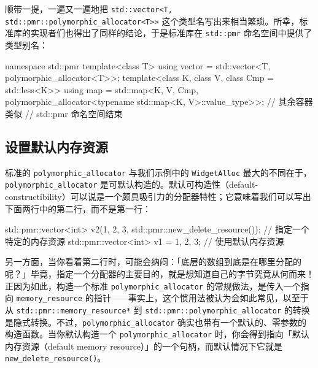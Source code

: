 顺带一提，一遍又一遍地把 \texttt{std::\allowbreak{}vector<\allowbreak{}T,\allowbreak{} std::\allowbreak{}pmr::\allowbreak{}polymorphic\_\allowbreak{}allocator<\allowbreak{}T>\allowbreak{}>} 这个类型名写出来相当繁琐。所幸，标准库的实现者们也得出了同样的结论，于是标准库在 \texttt{std::\allowbreak{}pmr} 命名空间中提供了类型别名：

\begin{codebox}[cpp]
    namespace std::pmr {
      template<class T>
      using vector = std::vector<T,
        polymorphic_allocator<T>>;
      template<class K, class V, class Cmp = std::less<K>>
      using map = std::map<K, V, Cmp,
        polymorphic_allocator<typename std::map<K, V>::value_type>>;
      // 其余容器类似
    } // std::pmr 命名空间结束
\end{codebox}

\subsection{设置默认内存资源}

标准的 \texttt{polymorphic\_\allowbreak{}allocator} 与我们示例中的 \texttt{Widget\allowbreak{}Alloc} 最大的不同在于，\texttt{polymorphic\_\allowbreak{}allocator} 是可默认构造的。默认可构造性（default-constructibility）可以说是一个颇具吸引力的分配器特性；它意味着我们可以写出下面两行中的第二行，而不是第一行：

\begin{codebox}[cpp]
    std::pmr::vector<int> v2({1, 2, 3}, std::pmr::new_delete_resource());
        // 指定一个特定的内存资源
    std::pmr::vector<int> v1 = {1, 2, 3};
        // 使用默认内存资源
\end{codebox}

另一方面，当你看着第二行时，可能会纳闷：「底层的数组到底是在哪里分配的呢？」毕竟，指定一个分配器的主要目的，就是想知道自己的字节究竟从何而来！正因为如此，构造一个标准 \texttt{polymorphic\_\allowbreak{}allocator} 的常规做法，是传入一个指向 \texttt{memory\_\allowbreak{}resource} 的指针——事实上，这个惯用法被认为会如此常见，以至于从 \texttt{std::\allowbreak{}pmr::\allowbreak{}memory\_\allowbreak{}resource*} 到 \texttt{std::\allowbreak{}pmr::\allowbreak{}polymorphic\_\allowbreak{}allocator} 的转换是隐式转换。不过，\texttt{polymorphic\_\allowbreak{}allocator} 确实也带有一个默认的、零参数的构造函数。当你默认构造一个 \texttt{polymorphic\_\allowbreak{}allocator} 时，你会得到指向「默认内存资源（default memory resource）」的一个句柄，而默认情况下它就是 \texttt{new\_\allowbreak{}delete\_\allowbreak{}resource(\allowbreak{})\allowbreak{}}。

